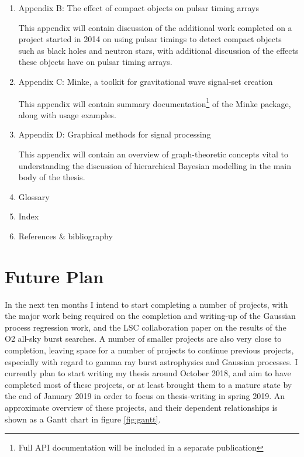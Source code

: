 \documentclass[openleft]{kentigern}
\theoremstyle{definition}
\begin{document}
\begin{enumerate}
\begin{enumerate}
  \item Appendix B: The effect of compact objects on pulsar timing arrays

    This appendix will contain discussion of the additional work
    completed on a project started in 2014 on using pulsar timings to
    detect compact objects such as black holes and neutron stars, with
    additional discussion of the effects these objects have on pulsar
    timing arrays.
    
  \item Appendix C: Minke, a toolkit for gravitational wave signal-set creation

    This appendix will contain summary documentation\footnote{Full API
      documentation will be included in a separate publication} of the
    Minke package, along with usage examples.
    
  \item Appendix D: Graphical methods for signal processing

    This appendix will contain an overview of graph-theoretic concepts
    vital to understanding the discussion of hierarchical Bayesian
    modelling in the main body of the thesis.
    
  \item Glossary
  \item Index
  \item References \& bibliography
  \end{enumerate}
\end{enumerate}


\chapter{Future Plan}\chapterprecis{}

In the next ten months I intend to start completing a number of
projects, with the major work being required on the completion and
writing-up of the Gaussian process regression work, and the LSC
collaboration paper on the results of the O2 all-sky burst searches. A
number of smaller projects are also very close to completion, leaving
space for a number of projects to continue previous projects,
especially with regard to gamma ray burst astrophysics and Gaussian
processes. I currently plan to start writing my thesis around October
2018, and aim to have completed most of these projects, or at least
brought them to a mature state by the end of January 2019 in order to
focus on thesis-writing in spring 2019. An approximate overview of
these projects, and their dependent relationships is shown as a Gantt
chart in figure \ref{fig:gantt}.
\end{document}
